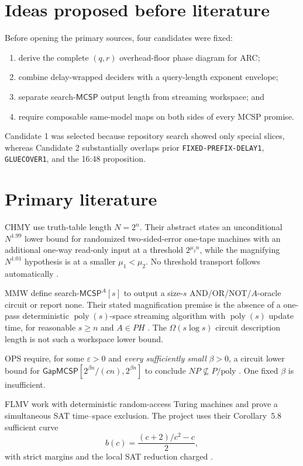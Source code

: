 \documentclass[11pt]{article}
\newcommand{\MCSP}{\mathsf{MCSP}}
\begin{document}
\section*{Ideas proposed before literature}
Before opening the primary sources, four candidates were fixed:
\begin{enumerate}[leftmargin=*]
  \item derive the complete $(q,r)$ overhead-floor phase diagram for ARC;
  \item combine delay-wrapped deciders with a query-length exponent envelope;
  \item separate search-$\MCSP$ output length from streaming workspace; and
  \item require composable same-model maps on both sides of every MCSP promise.
\end{enumerate}
Candidate 1 was selected because repository search showed only special slices,
whereas Candidate 2 substantially overlaps prior
\texttt{FIXED-PREFIX-DELAY1}, \texttt{GLUECOVER1}, and the 16:48 proposition.

\section*{Primary literature}
CHMY use truth-table length $N=2^n$.  Their abstract states an unconditional
$N^{1.99}$ lower bound for randomized two-sided-error one-tape machines with
an additional one-way read-only input at a threshold $2^{\mu_2 n}$, while the
magnifying $N^{1.01}$ hypothesis is at a smaller $\mu_1<\mu_2$.  No threshold
transport follows automatically \cite{CHMY}.

MMW define search-$\MCSP^A[s]$ to output a size-$s$ AND/OR/NOT/$A$-oracle
circuit or report none.  Their stated magnification premise is the absence of
a one-pass deterministic $\operatorname{poly}(s)$-space streaming algorithm
with $\operatorname{poly}(s)$ update time, for reasonable $s\ge n$ and
$A\in PH$ \cite{MMW}.  The $\Omega(s\log s)$ circuit description length is not
such a workspace lower bound.

OPS require, for some $\varepsilon>0$ and \emph{every sufficiently small}
$\beta>0$, a circuit lower bound for
$\mathsf{GapMCSP}[2^{\beta n}/(cn),2^{\beta n}]$ to conclude
$NP\nsubseteq P/\mathrm{poly}$ \cite{OPS}.  One fixed $\beta$ is insufficient.

FLMV work with deterministic random-access Turing machines and prove a
simultaneous SAT time--space exclusion.  The project uses their Corollary~5.8
sufficient curve
\begin{equation}
 b(c)=\frac{(c+2)/c^2-c}{2},
 \tag{2}
\end{equation}
with strict margins and the local SAT reduction charged \cite{FLMV}.
\end{document}
